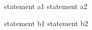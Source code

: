 \documentclass[varwidth=28em,crop]{standalone}
\begin{document}
\begin{minipage}{.27\linewidth}
\vspace{1em}
\begin{ccode}
statement a1
statement a2              
\end{ccode}
\end{minipage}\qquad
\begin{minipage}{.27\linewidth}
\vspace{1em}
\begin{ccode}
statement b1
statement b2          
\end{ccode}  
\end{minipage}
\end{document}

